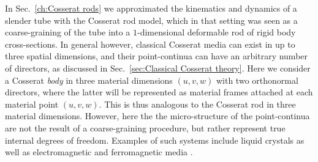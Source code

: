 In Sec.~\ref{ch:Cosserat rods} we approximated the kinematics and dynamics of a slender tube with the Cosserat rod model, which in that setting was seen as a coarse-graining of the tube into a $1$-dimensional deformable rod of rigid body cross-sections. In general however, classical Cosserat media can exist in up to three spatial dimensions, and their point-continua can have an arbitrary number of directors, as discussed in Sec.~\ref{sec:Classical Cosserat theory}. Here we consider a Cosserat \textit{body} in three material dimensions $(u, v, w)$ with two orthonormal directors, where the latter will be represented as material frames attached at each material point $(u, v, w)$. This is thus analogous to the Cosserat rod in three material dimensions. However, here the the micro-structure of the point-continua are not the result of a coarse-graining procedure, but rather represent true internal degrees of freedom. Examples of such systems include liquid crystals \citep{epsteinContinuousDistributionsInhomogeneities2001, gorielyRodTheoryLiquid2022} as well as electromagnetic and ferromagnetic media \citep{ivanovaNewTheoryCosserat2022, pariaUnifiedTheoryMechanics1978, ivanovaModelingPhysicalFields}.

